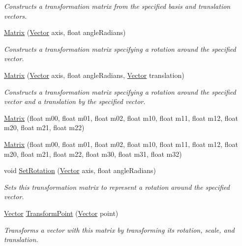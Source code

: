 \begin{DoxyCompactItemize}
\begin{DoxyCompactList}\small\item\em Constructs a transformation matrix from the specified basis and translation vectors. \end{DoxyCompactList}\item 
\mbox{\hyperlink{struct_leap_1_1_matrix_afa45522d026d02fc0965a3f54128c4b2}{Matrix}} (\mbox{\hyperlink{struct_leap_1_1_vector}{Vector}} axis, float angle\+Radians)
\begin{DoxyCompactList}\small\item\em Constructs a transformation matrix specifying a rotation around the specified vector. \end{DoxyCompactList}\item 
\mbox{\hyperlink{struct_leap_1_1_matrix_a8c05bb05e8ed2e16cd546aa059dbc717}{Matrix}} (\mbox{\hyperlink{struct_leap_1_1_vector}{Vector}} axis, float angle\+Radians, \mbox{\hyperlink{struct_leap_1_1_vector}{Vector}} translation)
\begin{DoxyCompactList}\small\item\em Constructs a transformation matrix specifying a rotation around the specified vector and a translation by the specified vector. \end{DoxyCompactList}\item 
\mbox{\hyperlink{struct_leap_1_1_matrix_aacb0b99975e8a07a8782098c3152be4a}{Matrix}} (float m00, float m01, float m02, float m10, float m11, float m12, float m20, float m21, float m22)
\item 
\mbox{\hyperlink{struct_leap_1_1_matrix_a8e3ea3f6969752cdea11bf23215bd9e2}{Matrix}} (float m00, float m01, float m02, float m10, float m11, float m12, float m20, float m21, float m22, float m30, float m31, float m32)
\item 
void \mbox{\hyperlink{struct_leap_1_1_matrix_a16f32d54d64ff6ed670844ede0dd7720}{Set\+Rotation}} (\mbox{\hyperlink{struct_leap_1_1_vector}{Vector}} axis, float angle\+Radians)
\begin{DoxyCompactList}\small\item\em Sets this transformation matrix to represent a rotation around the specified vector. \end{DoxyCompactList}\item 
\mbox{\hyperlink{struct_leap_1_1_vector}{Vector}} \mbox{\hyperlink{struct_leap_1_1_matrix_a7b8850c2aa058dd0d986325eb52ed3f9}{Transform\+Point}} (\mbox{\hyperlink{struct_leap_1_1_vector}{Vector}} point)
\begin{DoxyCompactList}\small\item\em Transforms a vector with this matrix by transforming its rotation, scale, and translation. \end{DoxyCompactList}\item 

\end{DoxyCompactItemize}
